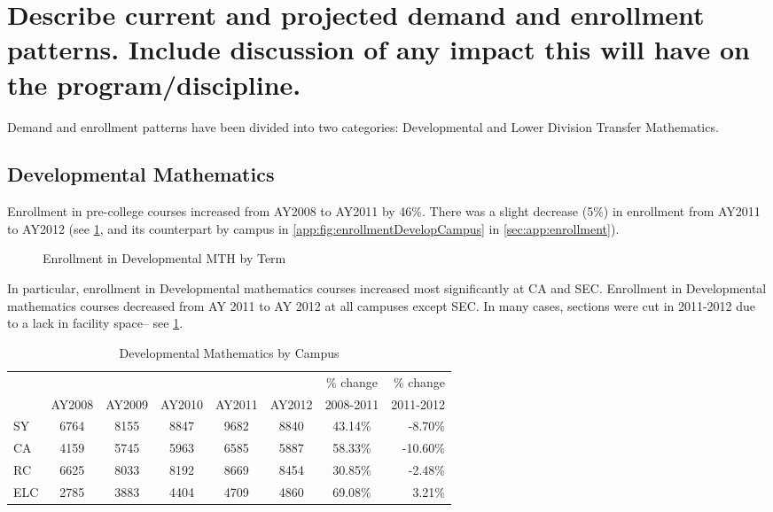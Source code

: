 \section{Describe current and projected demand and enrollment patterns.  Include discussion of any impact this will have on the program/discipline.
}
Demand and enrollment patterns have been divided into two categories: Developmental and Lower Division Transfer Mathematics.

\subsection{Developmental Mathematics}
Enrollment in pre-college courses increased from AY2008 to AY2011 by 46\%. There was a slight decrease (5\%) in enrollment from AY2011 to AY2012 (see \cref{needs:fig:enrollmentDevelopTerm}, and its counterpart by campus in \vref{app:fig:enrollmentDevelopCampus} in \cref{sec:app:enrollment}).

\begin{figure}[!htb]
	\centering
	
	\caption{Enrollment in Developmental MTH by Term}
	\label{needs:fig:enrollmentDevelopTerm}
\end{figure}

In particular, enrollment in Developmental mathematics courses increased most significantly at CA and SEC. Enrollment in Developmental mathematics courses decreased from AY 2011 to AY 2012 at all campuses except SEC. In many cases, sections were cut in 2011-2012 due to a lack in facility space-- see \cref{needs:tab:enrollmentDevelp}. 


\begin{table}[!htb]
	\caption{Developmental Mathematics by Campus}
	\label{needs:tab:enrollmentDevelp}
	\begin{tabular}{l*{6}{c}r}
		\toprule
		    &        &        &        &        &        & \% change & \% change \\
		    & AY2008 & AY2009 & AY2010 & AY2011 & AY2012 & 2008-2011 & 2011-2012 \\
		\midrule
		SY  & 6764   & 8155   & 8847   & 9682   & 8840   & 43.14\%   & -8.70\%   \\
		CA  & 4159   & 5745   & 5963   & 6585   & 5887   & 58.33\%   & -10.60\%  \\
		RC  & 6625   & 8033   & 8192   & 8669   & 8454   & 30.85\%   & -2.48\%   \\
		ELC & 2785   & 3883   & 4404   & 4709   & 4860   & 69.08\%   & 3.21\%    \\
		\bottomrule
	\end{tabular}
\end{table}


